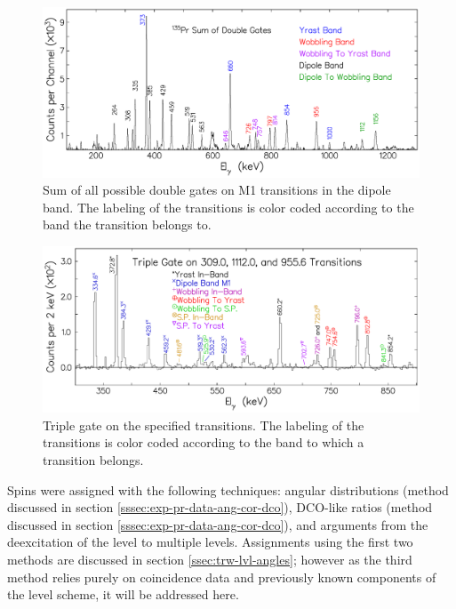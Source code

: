 \begin{figure}[ht!]
\centerline{\includegraphics[width=\textwidth]{./img/c4/sum_of_dbl_gate_ev.pdf}}
	\caption{Sum of all possible double gates on M1 transitions in the dipole band. The labeling of the transitions is color coded according to the band the transition belongs to. \label{fig:chp4-spec-dbl-gates}}
\end{figure}

\begin{figure}[h!]
\centerline{\includegraphics[width=\textwidth]{./img/c4/trip_gate_ev.pdf}}
	\caption{Triple gate on the specified transitions. The labeling of the transitions is color coded according to the band to which a transition belongs. \label{fig:chp4-spec-triple-gate}}
\end{figure}

Spins were assigned with the following techniques: angular distributions (method discussed in section \ref{sssec:exp-pr-data-ang-cor-dco}), DCO-like ratios (method discussed in section \ref{sssec:exp-pr-data-ang-cor-dco}), and arguments from the deexcitation of the level to multiple levels. Assignments using the first two methods are discussed in section \ref{ssec:trw-lvl-angles}; however as the third method relies purely on coincidence data and previously known components of the level scheme, it will be addressed here.


